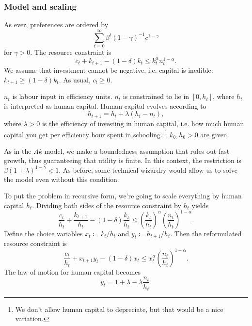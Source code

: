 \documentclass[11pt,letterpaper,reqno,oneside]{article}
\begin{document}
\subsubsection{Model and scaling}
\label{sec:04Nov2015:human_capital_accumulation_model:model_scaling}

As ever, preferences are ordered by
%
\begin{equation*}
	\sum_{t=0}^\infty \beta^t (1-\gamma)^{-1} c^{1-\gamma}
\end{equation*}
%
for $\gamma>0$. The resource constraint is
%
\begin{equation*}
	c_t + k_{t+1} - (1-\delta) k_t
	\leq k_t^\alpha n_t^{1-\alpha} .
\end{equation*}
%
We assume that investment cannot be negative, i.e. capital is inedible: $k_{t+1} \geq (1-\delta) k_t$. As usual, $c_t \geq 0$.

$n_t$ is labour input in efficiency units. $n_t$ is constrained to lie in $[0,h_t]$, where $h_t$ is interpreted as human capital. Human capital evolves according to
%
\begin{equation*}
	h_{t+1} = h_t + \lambda(h_t-n_t) ,
\end{equation*}
%
where $\lambda>0$ is the efficiency of investing in human capital, i.e. how much human capital you get per efficiency hour spent in schooling.%
	\footnote{We don't allow human capital to depreciate, but that would be a nice variation.}
$k_0,h_0>0$ are given.

As in the $Ak$ model, we make a boundedness assumption that rules out fast growth, thus guaranteeing that utility is finite. In this context, the restriction is $\beta( 1 + \lambda)^{1-\gamma} < 1$. As before, some technical wizardry would allow us to solve the model even without this condition.


To put the problem in recursive form, we're going to scale everything by human capital $h_t$. Dividing both sides of the resource constraint by $h_t$ yields
%
\begin{equation*}
	\frac{c_t}{h_t} + \frac{k_{t+1}}{h_t} - (1-\delta) \frac{k_t}{h_t}
	\leq \left( \frac{k_t}{h_t} \right)^\alpha \left( \frac{n_t}{h_t} \right)^{1-\alpha} .
\end{equation*}
%
Define the choice variables $x_t \coloneqq k_t / h_t$ and $y_t \coloneqq h_{t+1}/h_t$. Then the reformulated resource constraint is
%
\begin{equation*}
	\frac{c_t}{h_t} + x_{t+1} y_t - (1-\delta) x_t
	\leq x_t^\alpha \left( \frac{n_t}{h_t} \right)^{1-\alpha} .
\end{equation*}
%
The law of motion for human capital becomes
%
\begin{equation*}
	y_t = 1 + \lambda - \lambda \frac{n_t}{h_t} .
\end{equation*}
\end{document}
